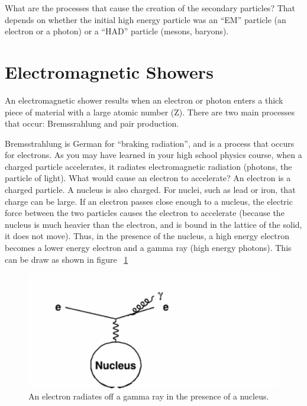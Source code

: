 \;

\noindent
What are the processes that cause the creation of the secondary particles? That depends on whether the initial high energy particle was an ``EM'' particle (an electron or a photon) or a ``HAD'' particle (mesons, baryons).

\section{Electromagnetic Showers}

\noindent
An electromagnetic shower results when an electron or photon enters a thick piece of material with a large atomic number (Z). There are two main processes that occur: Bremssrahlung and pair production.


\noindent
Bremsstrahlung is German for ``braking radiation'', and is a process that occurs for electrons. As you may have learned in your high school physics course, when a charged particle accelerates, it radiates electromagnetic radiation (photons, the particle of light). What would cause an electron to accelerate? An electron is a charged particle. A nucleus is also charged. For nuclei, such as lead or iron, that charge can be large. If an electron passes close enough to a nucleus, the electric force between the two particles causes the electron to accelerate (because the nucleus is much heavier than the electron, and is bound in the lattice of the solid, it does not move). Thus, in the presence of the nucleus, a high energy electron becomes a lower energy electron and a gamma ray (high energy photons). This can be draw as shown in figure ~\ref{fig:cal2}


\;
\;

\begin{figure}[h]
\centering\includegraphics[scale=0.7]{./calorimetry/Pictures/fig2.pdf}
\caption{An electron radiates off a gamma ray in the presence of a nucleus.}
\label{fig:cal2}
\end{figure}

